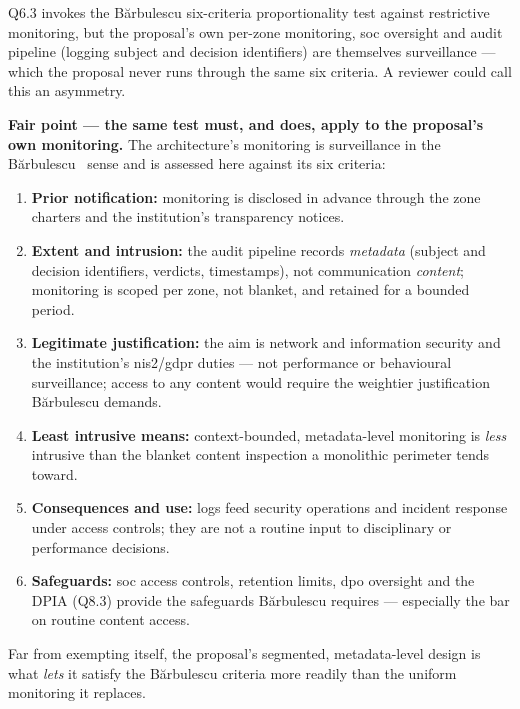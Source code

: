 \bigskip

\begin{questionbox}
Q6.3 invokes the B\u{a}rbulescu six-criteria proportionality test against restrictive monitoring, but the proposal's own per-zone monitoring, \gls{soc} oversight and audit pipeline (logging subject and decision identifiers) are themselves surveillance --- which the proposal never runs through the same six criteria. A reviewer could call this an asymmetry.
\end{questionbox}

\begin{answerbox}[Answer to Q8.4]
\textbf{Fair point --- the same test must, and does, apply to the proposal's own monitoring.} The architecture's monitoring is surveillance in the B\u{a}rbulescu~\cite{barbulescu2017} sense and is assessed here against its six criteria:
\begin{enumerate}[nosep]
  \item \textbf{Prior notification:} monitoring is disclosed in advance through the zone charters and the institution's transparency notices.
  \item \textbf{Extent and intrusion:} the audit pipeline records \emph{metadata} (subject and decision identifiers, verdicts, timestamps), not communication \emph{content}; monitoring is scoped per zone, not blanket, and retained for a bounded period.
  \item \textbf{Legitimate justification:} the aim is network and information security and the institution's \gls{nis2}/\gls{gdpr} duties --- not performance or behavioural surveillance; access to any content would require the weightier justification B\u{a}rbulescu demands.
  \item \textbf{Least intrusive means:} context-bounded, metadata-level monitoring is \emph{less} intrusive than the blanket content inspection a monolithic perimeter tends toward.
  \item \textbf{Consequences and use:} logs feed security operations and incident response under access controls; they are not a routine input to disciplinary or performance decisions.
  \item \textbf{Safeguards:} \gls{soc} access controls, retention limits, \gls{dpo} oversight and the DPIA (Q8.3) provide the safeguards B\u{a}rbulescu requires --- especially the bar on routine content access.
\end{enumerate}
\noindent Far from exempting itself, the proposal's segmented, metadata-level design is what \emph{lets} it satisfy the B\u{a}rbulescu criteria more readily than the uniform monitoring it replaces.


\end{answerbox}
